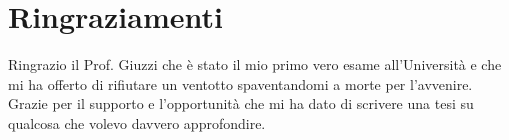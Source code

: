 \chapter*{Ringraziamenti}\label{ch:ringraziamenti}

Ringrazio il Prof. Giuzzi che è stato il mio primo vero esame all'Università e che mi ha offerto di rifiutare un ventotto spaventandomi a morte per l'avvenire. Grazie per il supporto e l’opportunità che mi ha dato di scrivere una tesi su qualcosa che volevo davvero approfondire.
